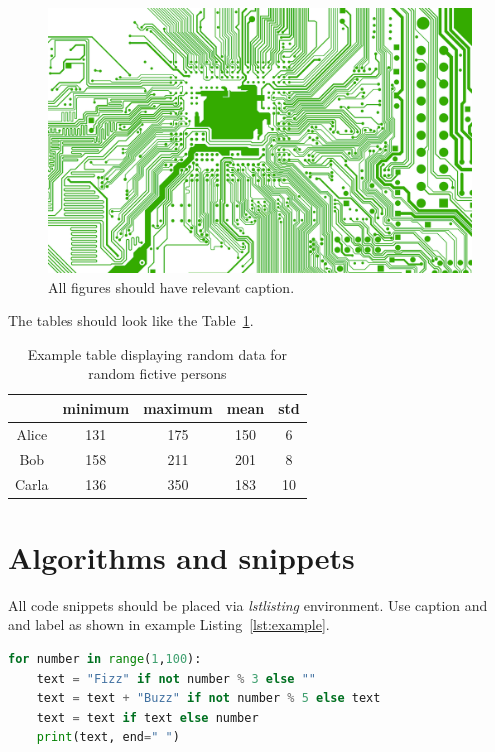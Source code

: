 \documentclass{pjtemplate}
\begin{document}
\begin{figure}[!ht]
\centering
\includegraphics[width=1.\textwidth]{example.png}
\caption{All figures should have relevant caption.}
\label{fig:example}
\end{figure}


The tables should look like the Table~\ref{tab:example}.

\begin{table}[!ht]
\centering
\caption{Example table displaying random data for random fictive persons}
\label{tab:example}

\begin{tabular}{c|c|c|c|c}
      & minimum & maximum & mean & std \\ \hline
Alice & 131     & 175     & 150  & 6   \\
Bob   & 158     & 211     & 201  & 8   \\
Carla & 136     & 350     & 183  & 10 
\end{tabular}
\end{table}




\section{Algorithms and snippets}

All code snippets should be placed via \emph{lstlisting} environment. Use caption and and label as shown in example Listing~\ref{lst:example}.


\begin{lstlisting}[caption={The following code snippet displays a solution of the Fizz Buzz problem.},label={lst:example},language=Python]
for number in range(1,100):
    text = "Fizz" if not number % 3 else ""
    text = text + "Buzz" if not number % 5 else text
    text = text if text else number
    print(text, end=" ")
\end{lstlisting}
\end{document}
